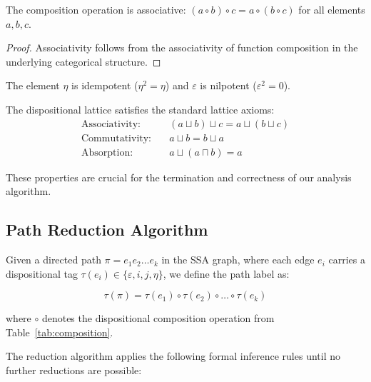 \documentclass[journal]{IEEEtran}
\begin{document}
\begin{theorem}[Associativity]
The composition operation is associative: $(a \circ b) \circ c = a \circ (b \circ c)$ for all elements $a, b, c$.
\end{theorem}

\begin{proof}
Associativity follows from the associativity of function composition in the underlying categorical structure.
\end{proof}

\begin{theorem}
The element $\eta$ is idempotent ($\eta^2 = \eta$) and $\varepsilon$ is nilpotent ($\varepsilon^2 = 0$).
\end{theorem}

\begin{theorem}
The dispositional lattice satisfies the standard lattice axioms:
\begin{align}
\text{Associativity:} \quad &(a \sqcup b) \sqcup c = a \sqcup (b \sqcup c) \\
\text{Commutativity:} \quad &a \sqcup b = b \sqcup a \\
\text{Absorption:} \quad &a \sqcup (a \sqcap b) = a
\end{align}
\end{theorem}

These properties are crucial for the termination and correctness of our analysis algorithm.

\subsection{Path Reduction Algorithm}

Given a directed path $\pi = e_1 e_2 \ldots e_k$ in the SSA graph, where each edge $e_i$ carries a dispositional tag $\tau(e_i) \in \{\varepsilon, i, j, \eta\}$, we define the path label as:

\begin{equation}
\tau(\pi) = \tau(e_1) \circ \tau(e_2) \circ \ldots \circ \tau(e_k)
\end{equation}

where $\circ$ denotes the dispositional composition operation from Table~\ref{tab:composition}.

The reduction algorithm applies the following formal inference rules until no further reductions are possible:
\end{document}
